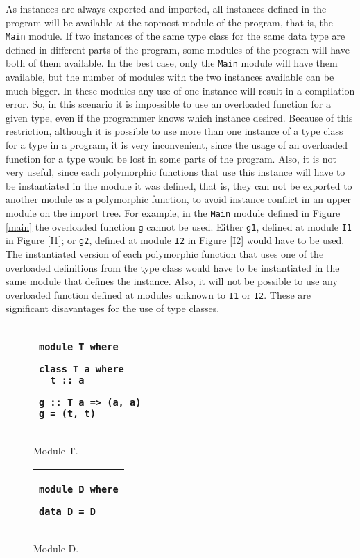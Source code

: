 \documentclass[msc]{ppgccufmg}
\begin{document}
As instances are always exported and imported, all instances defined in the
program will be available at the topmost module of the program, that is, the
\texttt{Main} module.  If two instances of the same type class for the same
data type are defined in different parts of the program, some modules of the
program will have both of them available.  In the best case, only the
\texttt{Main} module will have them available, but the number of modules with
the two instances available can be much bigger.  In these modules any use of
one instance will result in a
compilation error.  So, in this scenario it is impossible to use an overloaded
function for a given type, even if the programmer knows which instance desired.  Because of this restriction, although it is possible
to use more than one instance of a type class for a type in a program, it is
very inconvenient, since the usage of an overloaded function for a type would be
lost in some parts of the program.  Also, it is not very useful, since each polymorphic
  functions that use this instance will have to be instantiated in the module it was defined, that is, they can not be exported to another module as a polymorphic function,
  to avoid instance conflict in an upper module on the import tree.  For example, in the \texttt{Main} module defined
in Figure \ref{main} the overloaded function \texttt{g} cannot be used.  Either
\texttt{g1}, defined at module \texttt{I1} in Figure \ref{I1}; or \texttt{g2},
defined at module \texttt{I2} in Figure \ref{I2} would have to be used.  The
instantiated version of each polymorphic function that uses one of the overloaded
definitions from the type class would have to be instantiated in the same module
that defines the instance.  Also, it will not be possible to use any overloaded
function defined at modules unknown to \texttt{I1} or \texttt{I2}.  These are significant disavantages for the use of type classes.

\begin{figure}
\caption{Module T.\label{T}}
\begin{tabular}{|p{\textwidth}|}
\hline
\begin{verbatim}
module T where

class T a where
  t :: a

g :: T a => (a, a)
g = (t, t)
\end{verbatim}
\\
\hline
\end{tabular}
\end{figure}

\begin{figure}
\caption{Module D.\label{D}}
\begin{tabular}{|p{\textwidth}|}
\hline
\begin{verbatim}
module D where

data D = D
\end{verbatim}
\\
\hline
\end{tabular}
\end{figure}
\end{document}
